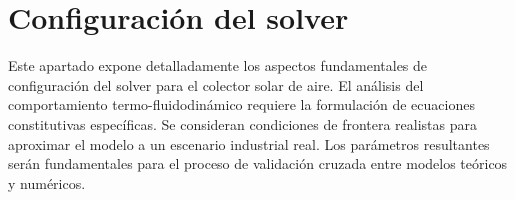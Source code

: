 \section{Configuración del solver}
\label{sec:cap07_solver}

Este apartado expone detalladamente los aspectos fundamentales de configuración del solver para el colector solar de aire.
El análisis del comportamiento termo-fluidodinámico requiere la formulación de ecuaciones constitutivas específicas.
Se consideran condiciones de frontera realistas para aproximar el modelo a un escenario industrial real.
Los parámetros resultantes serán fundamentales para el proceso de validación cruzada entre modelos teóricos y numéricos.
